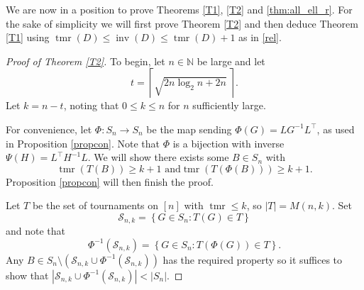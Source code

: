 \documentclass[a4paper, 12pt, reqno]{amsart}
\numberwithin{equation}{section}
\theoremstyle{plain}
\theoremstyle{remark}
\theoremstyle{definition}
\newcommand{\tmr}{\operatorname{tmr}}
\newcommand{\inv}{\operatorname{inv}}
\begin{document}
We are now in a position to prove Theorems \ref{T1}, \ref{T2} and \ref{thm:all_ell_r}. For the sake of simplicity we will first prove Theorem \ref{T2} and then deduce Theorem \ref{T1} using $\tmr(D) \leq \inv(D) \leq \tmr(D)+1$ as in \eqref{rel}.
\medskip
\begin{proof}[Proof of Theorem \ref{T2}]
    To begin, let $n \in \mathbb{N}$ be large and let 
      \begin{equation*}
        t=  \left \lceil \sqrt{2n\log_2 n+2n}~ \right \rceil.
      \end{equation*}
    Let $k = n-t$, 
    noting that $ 0 \leq k \le n$ for $n$ sufficiently large. 
    
    For convenience, let $\Phi : S_n \to S_n$ be the map sending $\Phi(G) = LG^{-1}L^{\top}$, as used in Proposition \ref{propcon}. Note that $\Phi$ is a bijection with inverse $\Psi(H) = L^{\top} H^{-1} L$.
    We will show there exists some $B \in S_n$ with 
    \begin{equation*}
        \tmr(T(B)) \geq k+1 \text{ and} \tmr(T(\Phi(B))) \geq k+1.
    \end{equation*}
    Proposition \ref{propcon} will then finish the proof. 
  
    Let $T$ be the set of tournaments on $[n]$ with $\tmr \leq k$, so $|T| = M(n,k)$. Set
    \begin{equation*}
        \mathcal{S}_{n, k} = \left\{ G \in S_n : T(G) \in T \right\}
    \end{equation*}
    and note that 
    \[
     \Phi^{-1}(\mathcal{S}_{n, k}) = \left\{ G \in S_n : T(\Phi(G)) \in T \right\}.
    \]
    Any $B \in S_n \setminus ({\mathcal{S}_{n, k} \cup \Phi^{-1}(\mathcal{S}_{n, k})} )$ has the required property so it suffices to show that $ |{{\mathcal{S}_{n, k} \cup \Phi^{-1}(\mathcal{S}_{n, k})}}|< |S_n|$. 
    

\end{proof}
\end{document}
